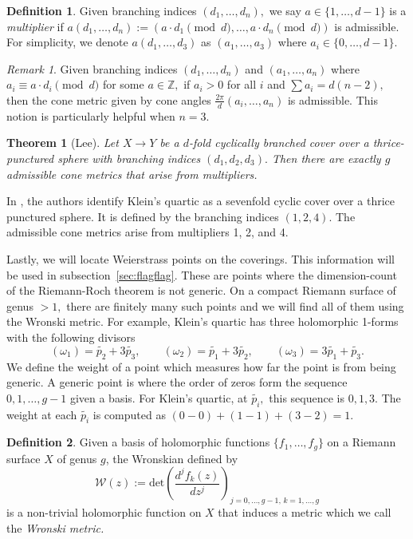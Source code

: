 \documentclass[12pt,reqno]{amsart}
\newtheorem*{thm*}{Theorem}
\theoremstyle{definition}
\newtheorem{defn}{Definition}
\theoremstyle{remark}
\newtheorem*{remark}{Remark}
\begin{document}
\begin{defn} Given branching indices $(d_1, \ldots , d_n),$ we say $a \in \{1, \ldots, d - 1\}$ is a \textit{multiplier} if $a (d_1, \ldots , d_n) := (a \cdot d_1 \pmod d, \ldots , a \cdot d_n \pmod d)$ is admissible. For simplicity, we denote $a (d_1,\ldots , d_3)$ as $(a_1, \ldots , a_3)$ where $a_i \in \{0, \ldots , d - 1\}.$ 
\end{defn}

\begin{remark} Given branching indices $(d_1, \ldots , d_n)$ and $(a_1, \ldots , a_n)$ where $a_i \equiv a \cdot d_i \pmod d$ for some $a \in \mathbb{Z},$ if $a_i > 0$ for all $i$ and $\sum a_i = d (n - 2),$ then the cone metric given by cone angles $\frac{2 \pi}{d} (a_i, \ldots , a_n)$ is admissible. This notion is particularly helpful when $n = 3.$\end{remark}

\begin{thm*} [Lee]
Let $X \rightarrow Y$ be a $d$-fold cyclically branched cover over a thrice-punctured sphere with branching indices $(d_1, d_2, d_3).$ Then there are exactly $g$ admissible cone metrics that arise from multipliers. 
\end{thm*}

In \cite{kw}, the authors identify Klein's quartic as a sevenfold cyclic cover over a thrice punctured sphere. It is defined by the branching indices $(1, 2, 4).$ The admissible cone metrics arise from multipliers 1, 2, and 4. 

Lastly, we will locate Weierstrass points on the coverings. This information will be used in subsection~\ref{sec:flagflag}. These are points where the dimension-count of the Riemann-Roch theorem is not generic. On a compact Riemann surface of genus $> 1,$ there are finitely many such points and we will find all of them using the Wronski metric. For example, Klein's quartic has three holomorphic 1-forms with the following divisors $$(\omega_1) = \widetilde{p_2} + 3 \widetilde{p_3}, \qquad (\omega_2) = \widetilde{p_1} + 3 \widetilde{p_2}, \qquad (\omega_3) = 3 \widetilde{p_1} + \widetilde{p_3}.$$ We define the weight of a point which measures how far the point is from being generic. A generic point is where the order of zeros form the sequence $0, 1, \ldots , g - 1$ given a basis. For Klein's quartic, at $\widetilde{p_i},$ this sequence is $0, 1, 3.$ The weight at each $\widetilde{p_i}$ is computed as $(0 - 0) + (1 - 1) + (3 - 2) = 1.$ 

\begin{defn}\label{def: wronski} Given a basis of holomorphic functions $\{f_1, \ldots , f_g\}$ on a Riemann surface $X$ of genus $g$, the Wronskian defined by $$\mathcal{W}(z) := \textrm{det} \left( \frac{d^j f_k(z)}{d z^j} \right)_{j = 0, \ldots , g - 1, \, k = 1, \ldots , g}$$ is a non-trivial holomorphic function on $X$ that induces a metric which we call the \textit{Wronski metric.} 
\end{defn}
\end{document}
